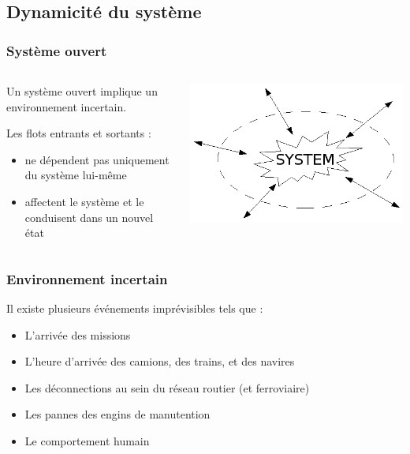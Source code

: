 \documentclass{beamer}
\begin{document}
\subsection*{Dynamicité du système}
\begin{frame}
\frametitle{Système ouvert}
	\begin{columns}
		\begin{column}[l]{8cm}
			Un système ouvert implique un environnement incertain.

			Les flots entrants et sortants : 
			\begin{itemize}
				\item ne dépendent pas uniquement du système lui-même
				\item affectent le système et le conduisent dans un nouvel état
			\end{itemize}
		\end{column}
		\begin{column}[r]{4cm}
			\begin{center}
				\includegraphics[height=.30\textheight]{fig/openSystem.png}
			\end{center}
	 	\end{column}
	\end{columns}
\end{frame}
\begin{frame}
\frametitle{Environnement incertain}
	Il existe plusieurs événements imprévisibles tels que :
	  \begin{itemize}
	  \item L'arrivée des missions
	  \item L'heure d'arrivée des camions, des  trains, et des navires
	  \item Les déconnections au sein du réseau routier (et ferroviaire)
	  \item Les pannes des engins de manutention
	  \item Le comportement humain %
	\end{itemize}
\end{frame}
\end{document}

